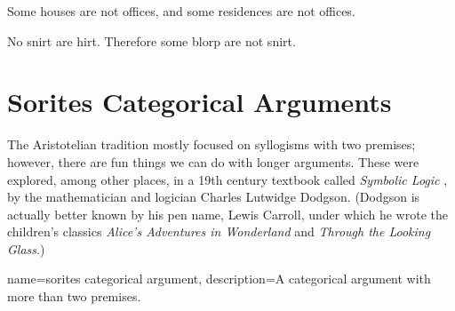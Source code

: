 \begin{exercises}
\item Some houses are not offices, and some residences are not offices.
%



\item No snirt are hirt. Therefore some blorp are not snirt.

\end{exercises}



\section{Sorites Categorical Arguments }

The Aristotelian tradition mostly focused on syllogisms with two premises; however, there are fun things we can do with longer arguments. These were explored, among other places, in a 19th century textbook called \textit{Symbolic Logic} \citep{Dodgson1896}, by the mathematician and logician Charles Lutwidge Dodgson. (Dodgson is actually better known by his pen name, Lewis Carroll, under which he wrote the children's classics \textit{Alice's Adventures in Wonderland} and \textit{Through the Looking Glass}.)

{
name=sorites categorical argument,
description={A categorical argument with more than two premises.}
}

